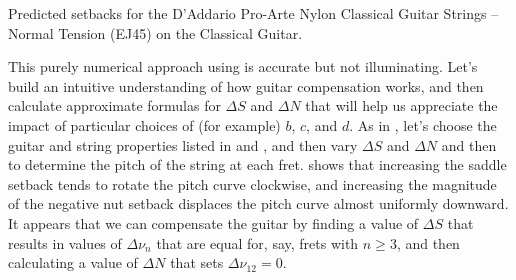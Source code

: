  \begin{table}[htbp]
  \centering
  \caption{\label{tbl:ej45_setbacks} Predicted setbacks for the D'Addario Pro-Arte Nylon Classical Guitar Strings -- Normal Tension (EJ45) on the Classical Guitar.}
  
\end{table}%


This purely numerical approach using  is accurate but not illuminating. Let's build an intuitive understanding of how guitar compensation works, and then calculate approximate formulas for $\Delta S$ and $\Delta N$ that will help us appreciate the impact of particular choices of (for example) $b$, $c$, and $d$. As in , let's choose the guitar and string properties listed in  and , and then vary $\Delta S$ and $\Delta N$ and then  to determine the pitch of the string at each fret.  shows that increasing the saddle setback tends to rotate the pitch curve clockwise, and increasing the magnitude of the negative nut setback displaces the pitch curve almost uniformly downward. It appears that we can compensate the guitar by finding a value of $\Delta S$ that results in values of $\Delta \nu_n$ that are equal for, say, frets with $n \ge 3$, and then calculating a value of $\Delta N$ that sets $\Delta \nu_{12} = 0$.

